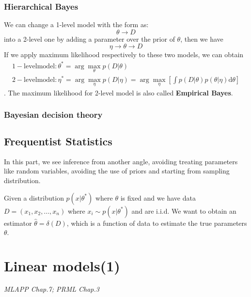 \documentclass{article}
\newcommand{\mrm}{\mathrm}
\begin{document}
\subsubsection*{Hierarchical Bayes}
We can change a 1-level model with the form as:
\begin{equation}
    \theta \rightarrow D
\end{equation}
into a 2-level one by adding a parameter over the prior of $\theta$, then we have
\begin{equation}
    \eta\rightarrow\theta\rightarrow D
\end{equation}
If we apply maximum likelihood respectively to these two models, we can obtain
\begin{gather}
    \mrm{1-level model: }\theta^*=\arg\max_{\theta}p(D|\theta) \\
    \mrm{2-level model: }\eta^*=\arg\max_\eta p(D|\eta)=\arg\max_{\eta}[\int p(D|\theta)p(\theta|\eta)\mrm d\theta]
\end{gather}.
The maximum likelihood for 2-level model is also called \textbf{Empirical Bayes}.
\subsubsection*{Bayesian decision theory}

\subsection*{Frequentist Statistics}
In this part, we see inference from another angle, avoiding treating parameters like random variables, avoiding the use of priors and starting from sampling distribution. 

Given a distribution $p(x|\theta^*)$ where $\theta$ is fixed and we have data $D=(x_1, x_2, \dots, x_n)$ where $x_i\sim p(x|\theta^*)$ and are i.i.d. We want to obtain an estimator $\hat{\theta}=\delta(D)$, which is a function of data to estimate the true parameters $\theta$. 

\section{Linear models(1)}
\emph{MLAPP Chap.7; PRML Chap.3}
\end{document}
